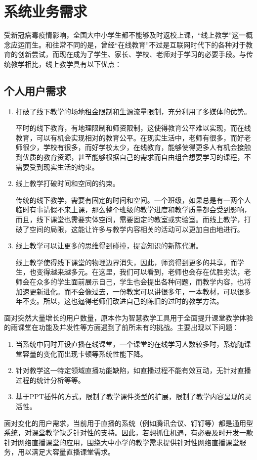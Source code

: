 \section{系统业务需求}
受新冠病毒疫情影响，全国大中小学生都不能够及时返校上课，“线上教学”这一概念应运而生。和往常不同的是，曾经“在线教育”不过是互联网时代下的各种对于教育的创新尝试，而现在成为了学生、家长、学校、老师对于学习的必要手段。与传统教学相比，线上教学具有以下优点：
\subsection{个人用户需求}

\begin{enumerate}
\item	打破了线下教学的场地租金限制和生源流量限制，充分利用了多媒体的优势。

平时的线下教育，有地理限制和师资限制，这使得教育公平难以实现，而在线教育，可以有机会实现相对的教育公平。在现实生活中，老师有很多，而好老师很少，学校有很多，而好学校太少，在线教育，能够使得更多人有机会接触到优质的教育资源，甚至能够根据自己的需求而自由组合想要学习的课程，不需要受到现实生活的约束。

\item	线上教学打破时间和空间的约束。

传统的线下教学，需要有固定的时间和空间。一个班级，如果总是有一两个人临时有事请假不来上课，那么整个班级的教学进度和教学质量都会受到影响，而且，线下课堂也需要实体空间，需要固定的教室或实验室。而线上教学，打破了空间的局限，这能让许多与教学内容相关的活动可以更加自由地进行。

\item	线上教学可以让更多的思维得到碰撞，提高知识的新陈代谢。

线上教学使得线下课堂的物理边界消失，因此，师资得到更多的共享，而学生，也变得越来越多元。在这里，我们可以看到，老师也会存在优胜劣汰，老师会在众多的学生面前展示自己，学生也会提出各种问题，而教学内容，也将加速更新进化。而不会像过去，一份教案可以讲很多年，一本教材，可以很多年不变。所以，这也逼得老师们改进自己的陈旧的过时的教学方法。
\end{enumerate}


面对突然大量增长的用户数量，原本作为智慧教学工具用于全面提升课堂教学体验的雨课堂在功能及并发性等方面遇到了前所未有的挑战。主要出现以下问题：
\begin{enumerate}

\item	当系统中同时开设直播在线课堂，一个课堂的在线学习人数较多时，系统随课堂容量的变化而出现卡顿等系统性能下降。
\item	针对教学这一特定领域直播功能缺陷，如直播过程不能有效互动，无针对直播过程的统计分析等等。
\item	基于PPT插件的方式，限制了教学课件类型的扩展，限制了教学内容呈现的灵活性。
\end{enumerate}

面对变化的用户需求，当前用于直播的系统（例如腾讯会议、钉钉等）都是通用型系统，对课堂教学缺乏针对性的支持。因此，若想抓住机遇，有必要及时开发一款针对网络直播课堂的应用，围绕大中小学的教学需求提供针对性网络直播课堂服务，用以满足大容量直播课堂需求。
